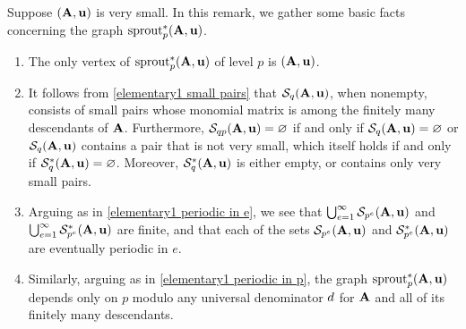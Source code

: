 \documentclass{amsart}
\begin{document}
\begin{remark}
   \label{elementary2: R}
   Suppose $(\mathbf{A},\mathbf{u})$ is very small.
   In this remark, we gather some basic facts concerning the graph $\operatorname{sprout}^{\ast}_p(\mathbf{A},\mathbf{u})$.
   \begin{enumerate}
      \item  \label{elementary2 lowest level}
      The only vertex of $\operatorname{sprout}_p^{\ast}(\mathbf{A},\mathbf{u})$ of level $p$ is $(\mathbf{A},\mathbf{u})$.
      \item \label{elementary2 small pairs}
      It follows from \eqref{elementary1 small pairs} that $\mathcal{S}_{q}(\mathbf{A},\mathbf{u})$, when nonempty, consists of small pairs whose monomial matrix is among the finitely many descendants of $\mathbf{A}$.
      Furthermore, $\mathcal{S}_{qp}(\mathbf{A},\mathbf{u}) = \varnothing$ if and only if $\mathcal{S}_q(\mathbf{A},\mathbf{u}) = \varnothing$ or $\mathcal{S}_q(\mathbf{A},\mathbf{u})$ contains a pair that is not very small, which itself holds if and only if $\mathcal{S}_{q}^{\ast}(\mathbf{A},\mathbf{u})= \varnothing$.
      Moreover, $\mathcal{S}_q^{\ast}(\mathbf{A},\mathbf{u})$ is either empty, or contains only very small pairs.
      \item \label{elementary2 periodic in e}
      Arguing as in \eqref{elementary1 periodic in e}, we see that $\bigcup_{e=1}^{\infty} \mathcal{S}_{p^e}(\mathbf{A},\mathbf{u})$ and  $\bigcup_{e=1}^{\infty} \mathcal{S}^{\ast}_{p^e}(\mathbf{A},\mathbf{u})$ are finite, and that each of the sets $\mathcal{S}_{p^e}(\mathbf{A},\mathbf{u})$ and $\mathcal{S}^{\ast}_{p^e}(\mathbf{A},\mathbf{u})$ are eventually periodic in $e$.
      \item \label{elementary2 periodic in p}
      Similarly, arguing as in \eqref{elementary1 periodic in p}, the graph $\operatorname{sprout}_p^{\ast}(\mathbf{A},\mathbf{u})$ depends only on $p$ modulo any universal denominator $d$ for $\mathbf{A}$  and all of its finitely many descendants.
   \end{enumerate}
\end{remark}
\end{document}
